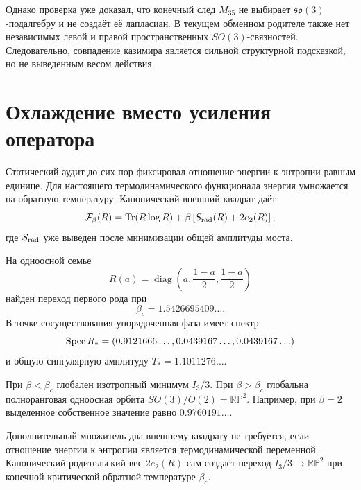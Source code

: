 Однако проверка
уже доказал, что конечный след $M_{35}$ не выбирает
$\mathfrak{so}(3)$-подалгебру и не создаёт её лапласиан. В текущем
обменном родителе также нет независимых левой и правой пространственных
$SO(3)$-связностей. Следовательно, совпадение казимира является сильной
структурной подсказкой, но не выведенным весом действия.

\section{Охлаждение вместо усиления оператора}

Статический аудит до сих пор фиксировал отношение энергии к энтропии
равным единице. Для настоящего термодинамического функционала энергия
умножается на обратную температуру. Канонический внешний квадрат даёт
\begin{equation}
 \mathcal F_\beta(R)
 =\operatorname{Tr}(R\log R)
 +\beta\left[S_{\rm rad}(R)+2e_2(R)\right],
 \label{eq:v6-canonical-thermal-exterior-free-energy}
\end{equation}
где $S_{\rm rad}$ уже выведен после минимизации общей амплитуды моста.

На одноосной семье
\begin{equation}
 R(a)=\operatorname{diag}\left(a,\frac{1-a}{2},\frac{1-a}{2}\right)
\end{equation}
найден переход первого рода при
\begin{equation}
 \boxed{\beta_c=1.5426695409\ldots.}
 \label{eq:v6-canonical-cooling-critical-beta}
\end{equation}
В точке сосуществования упорядоченная фаза имеет спектр
\begin{equation}
 \operatorname{Spec} R_*
 =(0.9121666\ldots,0.0439167\ldots,0.0439167\ldots)
 \label{eq:v6-canonical-cooling-coexistence-spectrum}
\end{equation}
и общую сингулярную амплитуду $T_*=1.1011276\ldots$.

При $\beta<\beta_c$ глобален изотропный минимум $I_3/3$. При
$\beta>\beta_c$ глобальна полноранговая одноосная орбита
$SO(3)/O(2)=\mathbb{RP}^2$. Например, при $\beta=2$ выделенное
собственное значение равно $0.9760191\ldots$.

\begin{theorem}
Дополнительный множитель два внешнему квадрату не требуется, если
отношение энергии к энтропии является термодинамической переменной.
Канонический родительский вес $2e_2(R)$ сам создаёт переход
$I_3/3\to\mathbb{RP}^2$ при конечной критической обратной температуре
$\beta_c$.
\end{theorem}

